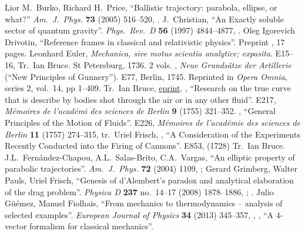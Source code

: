 \begin{thebibliography}{99}\footnotesize%
\setlength{\itemsep}{0pt plus 0.3ex}%
\setlength{\parskip}{0pt}
  Lior M.~Burko, Richard H.~Price,
  ``Ballistic trajectory: parabola, ellipse, or what?''
  \emph{Am.\ J.\ Phys.} {\bf 73} (2005) 516--520,
  . 
  J.~Christian,
  ``An Exactly soluble sector of quantum gravity''.
  \emph{Phys.\ Rev.\ D} {\bf 56} (1997) 4844--4877,
  .
  Oleg Igorevich Drivotin,
  ``Reference frames in classical and relativistic physics''.
  Preprint , 17 pages.
  Leonhard Euler, 
  \emph{Mechanica, sive motus scientia analytice; expasita}.
  E15--16,
  Tr.\ Ian Bruce. St Petersburg, 1736. 2 vols.
  \bysame, 
  \emph{Neue Grunds\"atze der Artillerie} (``New Principles of Gunnery'').
  E77,
  Berlin, 1745. Reprinted in \emph{Opera Omnia}, series 2, vol.~14,
  pp 1--409. Tr.\ Ian Bruce, \href{http://www.17centurymaths.com/contents/eulerartillery.htm}{eprint}.
  \bysame, 
  ``Research on the true curve that is describe by bodies shot through
  the air or in any other fluid''.
  E217,
  \emph{M\'emoires de l'acad\'emi des sciences de Berlin}
  \textbf{9} (1755) 321--352.
  \bysame, 
  ``General Principles of the Motion of Fluids''.
  E226,
  \emph{M\'emoires de l'acad\'emie des sciences de Berlin}
  {\bf 11} (1757) 274--315, tr.~Uriel Frisch,
  \bysame,
  ``A Consideration of the Experiments Recently Conducted into the
  Firing of Cannons''.
  E853,
  (1728)
  Tr.\ Ian Bruce.
  J.L.~Fern\'andez-Chapou, A.L.~Salas-Brito, C.A.~Vargas,
  ``An elliptic property of parabolic trajectories''.
  \emph{Am.\ J.\ Phys.} \textbf{72} (2004) 1109,
  ;
  Gerard Grimberg, Walter Pauls, Uriel Frisch,
  ``Genesis of d'Alembert's paradox and analytical elaboration of the drag problem''.
  \emph{Physica D} {\bf237} no.~14--17 (2008) 1878--1886,
  ;
  .
  Julio G\"u\'emez, Manuel Fiolhais,
  ``From mechanics to thermodynamics -- analysis of selected examples''.
  \emph{European Journal of Physics} {\bf 34} (2013) 345--357,
  \bysame, \bysame,
  ``A 4-vector formalism for classical mechanics''.

\end{thebibliography}
